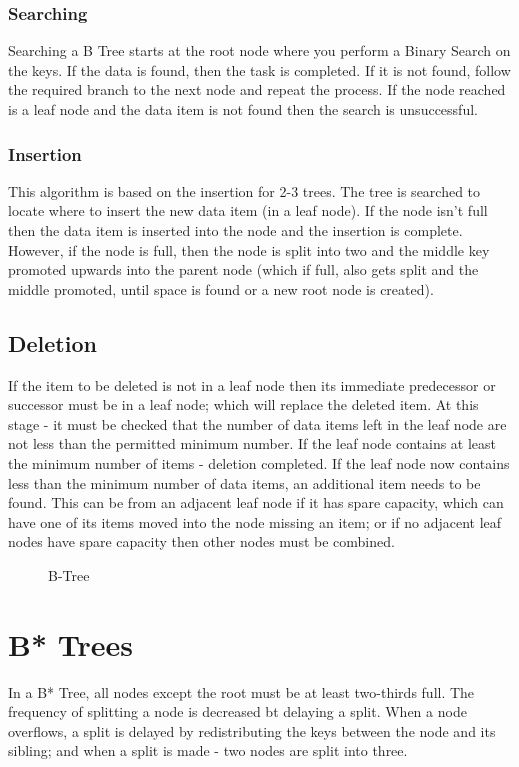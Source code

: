 \subsubsection{Searching}
Searching a B Tree starts at the root node where you perform a Binary Search on the keys. If the data is found, then the task is completed. If it is not found, follow the required branch to the next node and repeat the process. If the node reached is a leaf node and the data item is not found then the search is unsuccessful.
\subsubsection{Insertion}
This algorithm is based on the insertion for 2-3 trees. The tree is searched to locate where to insert the new data item (in a leaf node). If the node isn't full then the data item is inserted into the node and the insertion is complete. However, if the node is full, then the node is split into two and the middle key promoted upwards into the parent node (which if full, also gets split and the middle promoted, until space is found or a new root node is created). 
\subsection{Deletion}
If the item to be deleted is not in a leaf node then its immediate predecessor or successor must be in a leaf node; which will replace the deleted item. At this stage - it must be checked that the number of data items left in the leaf node are not less than the permitted minimum number. If the leaf node contains at least the minimum number of items - deletion completed. If the leaf node now contains less than the minimum number of data items, an additional item needs to be found. This can be from an adjacent leaf node if it has spare capacity, which can have one of its items moved into the node missing an item; or if no adjacent leaf nodes have spare capacity then other nodes must be combined. 

\begin{figure}[H]
    \centering
    
    \caption{B-Tree} 
\end{figure}

\section{B* Trees}
In a B* Tree, all nodes except the root must be at least two-thirds full. The frequency of splitting a node is decreased bt delaying a split. When a node overflows, a split is delayed by redistributing the keys between the node and its sibling; and when a split is made - two nodes are split into three.

